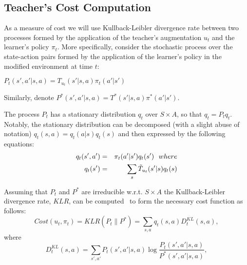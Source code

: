 \documentclass[letterpaper]{aamas2010}
\begin{document}
\subsection{Teacher's Cost Computation}
As a measure of cost we will use Kullback-Leibler divergence rate
between two processes formed by the application of the teacher's
augmentation $u_t$ and the learner's policy $\pi_t$. More specifically,
consider the stochastic process over the state-action pairs formed by
the application of the learner's policy in the modified environment at
time $t$: \\
\centerline{$
P_t(s',a'|s,a)=T_{u_t}(s'|s,a)\pi_t(a'|s')
$}

Similarly, denote $P^*(s',a'|s,a)=T^*(s'|s,a)\pi^*(a'|s')$.

The process $P_t$ has a stationary distribution $q_t$ over $S\times
A$, so that $q_t=P_tq_t$. Notably, the stationary distribution can be
decomposed (with a slight abuse of notation) $q_t(s,a)=q_t(a|s)q_t(s)$
and then expressed by the following equations:
\begin{eqnarray*}
q_t(s',a')&=&\pi_t(a'|s')q_t(s')\ \ \displaystyle{where}\\
q_t(s')&=&\sum\limits_s\Tilde{T}_{u_t}(s'|s)q_t(s)
\end{eqnarray*}

Assuming that $P_t$ and $P^*$ are irreducible w.r.t. $S\times A$ the
Kullback-Leibler divergence rate, $KLR$, can be
computed~\cite{rached_alajaji_campbell_2004} to form the necessary
cost function as follows:
$$
Cost(u_t,\pi_t)=KLR(P_t\|P^*)=\sum\limits_{s,a}q_t(s,a)D^{KL}_t(s,a),$$
where $$D^{KL}_t(s,a)=\sum\limits_{s',a'}P_t(s',a'|s,a)\log\frac{P_t(s',a'|s,a)}{P^*(s',a'|s,a)},
$$
\end{document}
